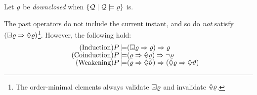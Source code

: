  Let $\varrho$ be \emph{downclosed} when
  $\{ \mathcal{Q} \mid \mathcal{Q} \models \varrho \}$ is.


  The past operators do not include the current instant, and so
  do \emph{not} satisfy
  $(\Box\mkern-8.8mu\text{-}\mkern3mu\varrho\Rightarrow\Diamond\mkern-10.1mu\text{-}\mkern4mu\varrho)$\footnote{The order-minimal elements always validate
    $\Box\mkern-8.8mu\text{-}\mkern3mu\varrho$ and invalidate
    $\Diamond\mkern-10.1mu\text{-}\mkern4mu\varrho$.}.
  However, the following hold:
\begin{align*}
  \tag{Induction}
  \aPS \models& (\always\afo \Rightarrow\afo) \Rightarrow\afo
  \\[-1ex]
  \tag{Coinduction}
  \aPS \models& (\afo \Rightarrow\once{\afo}) \Rightarrow\lnot \afo
  \\[-1ex]
  \tag{Weakening}
  \aPS \models& (\afo \Rightarrow\once{\bfo}) \Rightarrow (\once\afo \Rightarrow\once{\bfo})
\end{align*}

